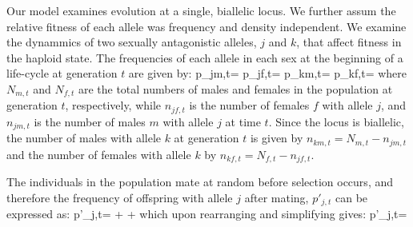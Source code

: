 \documentclass[12pt]{article}
\let\oldequation\equation
\let\oldendequation\endequation
\renewenvironment{equation}
  {\linenomathNonumbers\oldequation}
  {\oldendequation\endlinenomath}
\begin{document}
Our model examines evolution at a single, biallelic locus. We further assum the relative fitness of each allele was frequency and density independent. We examine the dynammics of two  sexually antagonistic alleles, $j$ and $k$, that affect fitness in the haploid state. The frequencies of each allele in each sex at the beginning of a life-cycle at generation $t$ are given by:
\begin{equation}
    p_{jm,t}= 
    \label{first_pop}
\end{equation}
\begin{equation}
    p_{jf,t}= 
\end{equation}
\begin{equation}
    p_{km,t}=  
\end{equation}
\begin{equation}
    p_{kf,t}= 
\end{equation}
where $N_{m,t}$ and $N_{f,t}$ are the total numbers of males and females in the population at generation $t$, respectively, while $n_{jf,t}$ is the number of females $f$ with allele $j$, and $n_{jm,t}$ is the number of males $m$ with allele $j$ at time $t$. Since the locus is biallelic, the number of males with allele $k$ at generation $t$ is given by $n_{km,t}=N_{m,t}-n_{jm,t}$ and the number of females with allele $k$ by $n_{kf,t}=N_{f,t}-n_{jf,t}$.

The individuals in the population mate at random before selection occurs, and therefore the frequency of offspring with allele $j$ after mating, $p'_{j,t}$ can be expressed as:
\begin{equation}
   p'_{j,t}=   +    +
    
   \label{prime_a}
\end{equation}
which upon rearranging and simplifying gives:
\begin{equation}
   p'_{j,t}= 
   \label{pprime}
\end{equation}
\end{document}
